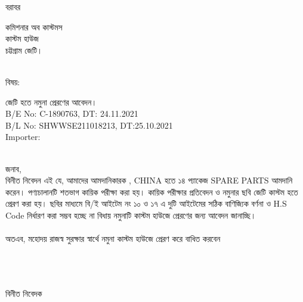 \documentclass[12pt]{article}
\newcommand{\beno}{C-1890763}
\newcommand{\bedt}{24.11.2021}
\newcommand{\blno}{SHWWSE211018213}
\newcommand{\bldt}{25.10.2021}
\newcommand{\good}{SPARE PARTS}
\newcommand{\co}{CHINA}
\newcommand{\impn}{\htf}
\begin{document}
\noindent
বরাবর
\\
\begin{minipage}[t]{0.06\linewidth}
\hspace{1em}
\end{minipage}
\begin{minipage}[t]{0.94\linewidth}
কমিশনার অব কাস্টমস
\\
কাস্টম হাউজ
\\
চট্টগ্রাম জেটি।
\\
\\
\end{minipage}
\begin{minipage}[t]{0.06\linewidth}
বিষয়:
\end{minipage}
\begin{minipage}[t]{0.94\linewidth}
জেটি হতে নমুনা প্রেরণের আবেদন।
\\
B/E No: {\beno}, DT: {\bedt}
\\
B/L No: {\blno}, DT:{\bldt}
\\
Importer: {\impn}
\\
\\
\end{minipage}
জনাব,
\\
\hspace*{2.7em}বিনীত নিবেদন এই যে, আমাদের আমদানিকারক {\impn},
{\co} হতে ১৪ প্যাকেজ {\good}
আমদানি করেন।
পণ্যচালানটি শতভাগ কায়িক পরীক্ষা
করা হয়। কায়িক পরীক্ষার প্রতিবেদন ও নমুনার ছবি
জেটি কাস্টম হতে প্রেরণ করা হয়।
ছবির মাধ্যমে বি/ই আইটেম নং ১০ ও ১৭ এ দুটি আইটেমের সঠিক
বাণিজ্যিক বর্ণনা ও H.S Code নির্ধারণ করা সম্ভব হচ্ছে না
বিধায় নমুনাটি কাস্টম হাউজে প্রেরণের জন্য আবেদন জানাচ্ছি।
\\
\\
অতএব, মহোদয় রাজস্ব সুরক্ষার স্বার্থে
নমুনা কাস্টম হাউজে প্রেরণ করে বাধিত
করবেন
\\
\\
\\
\\
\begin{minipage}[t]{0.50\linewidth}
\hspace{1em}
\end{minipage}
\begin{minipage}[t]{0.60\linewidth}
বিনীত নিবেদক
\\
\\
\\
\\
\\
{\cnfn}
\end{minipage}
\thispagestyle{laststyle}
\end{document}
